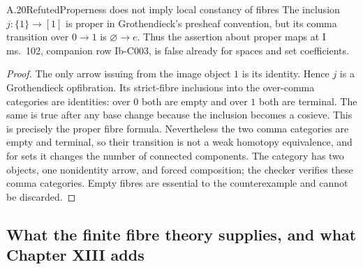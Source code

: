 \begin{claim}{A.20}{Refuted}{Properness does not imply local constancy of fibres}
The inclusion $j:\{1\}\to[1]$ is proper in Grothendieck's presheaf convention, but its comma transition over $0\to1$ is $\varnothing\to e$. Thus the assertion about proper maps at I ms.~102, companion row Ib-C003, is false already for spaces and set coefficients.
\end{claim}
\begin{proof}
The only arrow issuing from the image object $1$ is its identity. Hence $j$ is a Grothendieck opfibration. Its strict-fibre inclusions into the over-comma categories are identities: over $0$ both are empty and over $1$ both are terminal. The same is true after any base change because the inclusion becomes a cosieve. This is precisely the proper fibre formula. Nevertheless the two comma categories are empty and terminal, so their transition is not a weak homotopy equivalence, and for sets it changes the number of connected components. The category has two objects, one nonidentity arrow, and forced composition; the checker verifies these comma categories. Empty fibres are essential to the counterexample and cannot be discarded.
\end{proof}

\subsection{What the finite fibre theory supplies, and what Chapter XIII adds}


